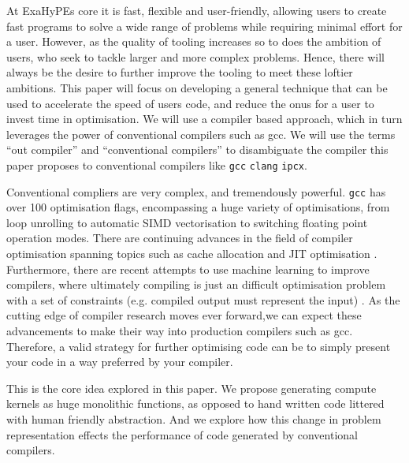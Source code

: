 At ExaHyPEs core it is fast, flexible and user-friendly, allowing users to create fast programs to solve a wide range of problems while requiring minimal effort for a user.
However, as the quality of tooling increases so to does the ambition of users, who seek to tackle larger and more complex problems.
Hence, there will always be the desire to further improve the tooling to meet these loftier ambitions.
This paper will focus on developing a general technique that can be used to accelerate the speed of users code, and reduce the onus for a user to invest time in optimisation.
We will use a compiler based approach, which in turn leverages the power of conventional compilers such as gcc.
We will use the terms ``out compiler'' and ``conventional compilers'' to disambiguate the compiler this paper proposes to conventional compilers like \texttt{gcc} \texttt{clang} \texttt{ipcx}.  


Conventional compliers are very complex, and tremendously powerful.
\texttt{gcc} has over 100 optimisation flags, encompassing a huge variety of optimisations, from loop unrolling to automatic SIMD vectorisation to switching floating point operation modes.
There are continuing advances in the field of compiler optimisation spanning topics such as cache allocation and JIT optimisation \cite{weak-compiler-survey}.
Furthermore, there are recent attempts to use machine learning to improve compilers, where ultimately compiling is just an difficult optimisation problem with a set of constraints (e.g. compiled output must represent the input) \cite{compiler-ml-opt}.
As the cutting edge of compiler research moves ever forward,we can expect these advancements to make their way into production compilers such as gcc.
Therefore, a valid strategy for further optimising code can be to simply present your code in a way preferred by your compiler.

This is the core idea explored in this paper.
We propose generating compute kernels as huge monolithic functions, as opposed to hand written code littered with human friendly abstraction.
And we explore how this change in problem representation effects the performance of code generated by conventional compilers.
